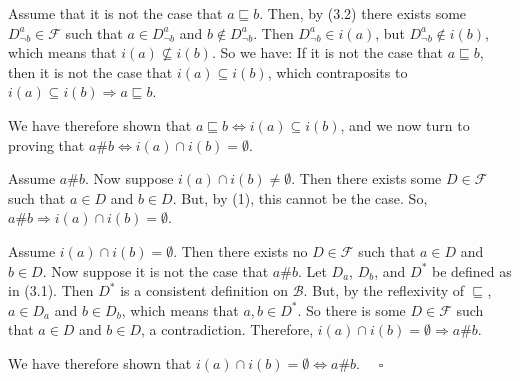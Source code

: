 Assume that it is not the case that $a\sqsubseteq b$. Then, by (3.2) there exists some $D^a_{\lnot b}\in\mathcal{F}$ such that $a\in D^a_{\lnot b}$ and $b\notin D^a_{\lnot b}$. Then $D^a_{\lnot b}\in i(a)$, but $D^a_{\lnot b}\notin i(b)$, which means that $i(a)\not\subseteq i(b)$. So we have: If it is not the case that $a\sqsubseteq b$, then it is not the case that $i(a)\subseteq i(b)$, which contraposits to $i(a)\subseteq i(b)\Rightarrow a\sqsubseteq b$.

We have therefore shown that $a\sqsubseteq b\Leftrightarrow i(a)\subseteq i(b)$, and we now turn to proving that $a\#b\Leftrightarrow i(a)\cap i(b)=\emptyset$.

Assume $a\#b$. Now suppose $i(a)\cap i(b)\neq\emptyset$. Then there exists some $D\in\mathcal{F}$ such that $a\in D$ and $b\in D$. But, by (1), this cannot be the case. So,  $a\#b\Rightarrow i(a)\cap i(b)=\emptyset$.

Assume $i(a)\cap i(b)=\emptyset$. Then there exists no $D\in\mathcal{F}$ such that $a\in D$ and $b\in D$. Now suppose it is not the case that $a\#b$. Let $D_a$, $D_b$, and $D^*$ be defined as in (3.1). Then  $D^*$ is a consistent definition on $\mathcal{B}$. But, by the reflexivity of $\sqsubseteq $, $a\in D_a$ and $b\in D_b$, which means that $a,b\in D^*$. So there is some $D\in\mathcal{F}$ such that $a\in D$ and $b\in D$, a contradiction. Therefore, $i(a)\cap i(b)=\emptyset\Rightarrow a\#b$.

We have therefore shown that $i(a)\cap i(b)=\emptyset\Leftrightarrow a\#b$. $\quad\square$

\clearpage
